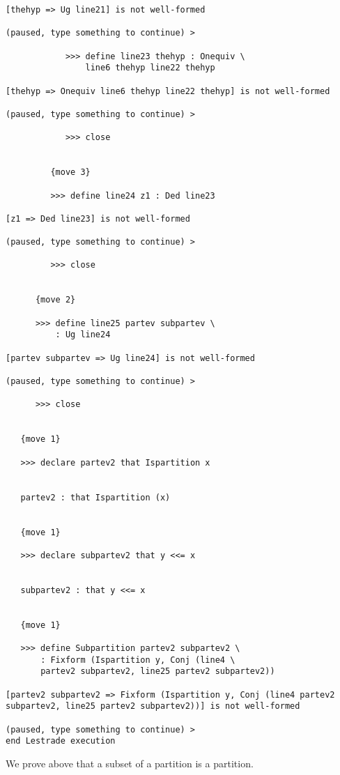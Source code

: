 \documentclass[12pt]{article}
\begin{document}
\begin{verbatim}
[thehyp => Ug line21] is not well-formed

(paused, type something to continue) >

            >>> define line23 thehyp : Onequiv \
                line6 thehyp line22 thehyp

[thehyp => Onequiv line6 thehyp line22 thehyp] is not well-formed

(paused, type something to continue) >

            >>> close


         {move 3}

         >>> define line24 z1 : Ded line23

[z1 => Ded line23] is not well-formed

(paused, type something to continue) >

         >>> close


      {move 2}

      >>> define line25 partev subpartev \
          : Ug line24

[partev subpartev => Ug line24] is not well-formed

(paused, type something to continue) >

      >>> close


   {move 1}

   >>> declare partev2 that Ispartition x


   partev2 : that Ispartition (x)


   {move 1}

   >>> declare subpartev2 that y <<= x


   subpartev2 : that y <<= x


   {move 1}

   >>> define Subpartition partev2 subpartev2 \
       : Fixform (Ispartition y, Conj (line4 \
       partev2 subpartev2, line25 partev2 subpartev2))

[partev2 subpartev2 => Fixform (Ispartition y, Conj (line4 partev2 subpartev2, line25 partev2 subpartev2))] is not well-formed

(paused, type something to continue) >
end Lestrade execution
\end{verbatim}

We prove above that a subset of a partition is a partition.
\end{document}
